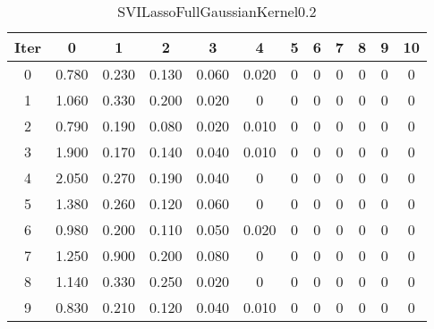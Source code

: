 \begin{table}
	\begin{center}
		\begin{tabular}{|c|c|c|c|c|c|c|c|c|c|c|c|}
			\hline
			Iter & 0 & 1 & 2 & 3 & 4 & 5 & 6 & 7 & 8 & 9 & 10 \\
			\hline
			0 & 0.780 & 0.230 & 0.130 & 0.060 & 0.020 & 0 & 0 & 0 & 0 & 0 & 0 \\
			\hline
			1 & 1.060 & 0.330 & 0.200 & 0.020 & 0 & 0 & 0 & 0 & 0 & 0 & 0 \\
			\hline
			2 & 0.790 & 0.190 & 0.080 & 0.020 & 0.010 & 0 & 0 & 0 & 0 & 0 & 0 \\
			\hline
			3 & 1.900 & 0.170 & 0.140 & 0.040 & 0.010 & 0 & 0 & 0 & 0 & 0 & 0 \\
			\hline
			4 & 2.050 & 0.270 & 0.190 & 0.040 & 0 & 0 & 0 & 0 & 0 & 0 & 0 \\
			\hline
			5 & 1.380 & 0.260 & 0.120 & 0.060 & 0 & 0 & 0 & 0 & 0 & 0 & 0 \\
			\hline
			6 & 0.980 & 0.200 & 0.110 & 0.050 & 0.020 & 0 & 0 & 0 & 0 & 0 & 0 \\
			\hline
			7 & 1.250 & 0.900 & 0.200 & 0.080 & 0 & 0 & 0 & 0 & 0 & 0 & 0 \\
			\hline
			8 & 1.140 & 0.330 & 0.250 & 0.020 & 0 & 0 & 0 & 0 & 0 & 0 & 0 \\
			\hline
			9 & 0.830 & 0.210 & 0.120 & 0.040 & 0.010 & 0 & 0 & 0 & 0 & 0 & 0 \\
			\hline
		\end{tabular}
	\end{center}
	\caption{SVILassoFullGaussianKernel0.2}
\end{table}